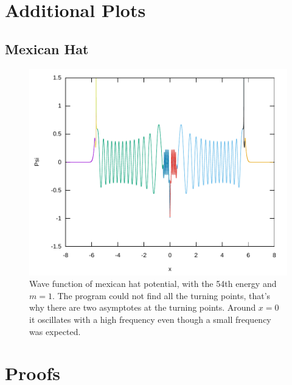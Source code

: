 \documentclass[11pt,DIV=10,final]{scrreprt} %
\begin{document}
{\begin{appendix}
\section{Additional Plots}
\subsection{Mexican Hat}
\begin{figure}[H]
  \centering
    \includegraphics[width=\textwidth]{plots/mexican-hat-54.pdf}
    \caption{
      Wave function of mexican hat potential, with the 54th energy and $m = 1$. The program could not find all the turning points, that's why there are two asymptotes at the turning points.
      Around $x = 0$ it oscillates with a high frequency even though a small frequency was expected.
    }\label{fig:mexican-hat-54th-energy}
\end{figure}


\section{Proofs}

\end{appendix}}
\end{document}
